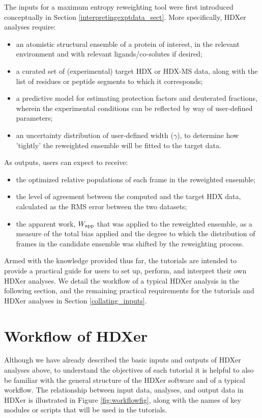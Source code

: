 \documentclass[9pt,tutorial,ASAPversion]{livecoms}
\begin{document}
The inputs for a maximum entropy reweighting tool were first introduced conceptually in Section \ref{interpretingexptdata_sect}. More specifically, HDXer analyses require:
\begin{itemize}
    \item an atomistic structural ensemble of a protein of interest, in the relevant environment and with relevant ligands/co-solutes if desired;
    \item a curated set of (experimental) target HDX or HDX-MS data, along with the list of residues or peptide segments to which it corresponds;
    \item a predictive model for estimating protection factors and deuterated fractions, wherein the experimental conditions can be reflected by way of user-defined parameters;
    \item an uncertainty distribution of user-defined width ($\gamma$), to determine how 'tightly' the reweighted ensemble will be fitted to the target data.
\end{itemize}
As outputs, users can expect to receive:
\begin{itemize}
    \item the optimized relative populations of each frame in the reweighted ensemble;
    \item the level of agreement between the computed and the target HDX data, calculated as the RMS error between the two datasets;
    \item the apparent work, $W_{\textnormal{app}}$ that was applied to the reweighted ensemble, as a measure of the total bias applied and the degree to which the distribution of frames in the candidate ensemble was shifted by the reweighting process.
\end{itemize}
Armed with the knowledge provided thus far, the tutorials are intended to provide a practical guide for users to set up, perform, and interpret their own HDXer analyses.
We detail the workflow of a typical HDXer analysis in the following section, and the remaining practical requirements for the tutorials and HDXer analyses in Section \ref{collating_inputs}.

\section{Workflow of HDXer}
Although we have already described the basic inputs and outputs of HDXer analyses above, to understand the objectives of each tutorial it is helpful to also be familiar with the general structure of the HDXer software and of a typical workflow.
The relationship between input data, analyses, and output data in HDXer is illustrated in Figure \ref{fig:workflowfig}, along with the names of key modules or scripts that will be used in the tutorials.
\end{document}
